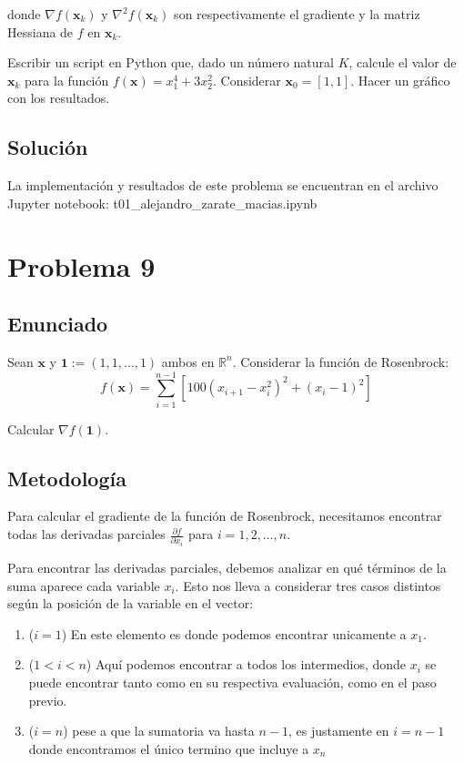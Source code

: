 \documentclass{article}
\begin{document}
donde $\nabla f(\mathbf{x}_k)$ y $\nabla^2 f(\mathbf{x}_k)$ son respectivamente el gradiente y la matriz Hessiana de $f$ en $\mathbf{x}_k$.

Escribir un script en Python que, dado un número natural $K$, calcule el valor de $\mathbf{x}_k$ para la función $f(\mathbf{x}) = x_1^4 + 3x_2^2$. Considerar $\mathbf{x}_0 = [1, 1]$. Hacer un gráfico con los resultados.

\subsection{Solución}
La implementación y resultados de este problema se encuentran en el archivo Jupyter notebook: t01\_alejandro\_zarate\_macias.ipynb

\section{Problema 9}

\subsection{Enunciado}
Sean $\mathbf{x}$ y $\mathbf{1} := (1, 1, \ldots, 1)$ ambos en $\mathbb{R}^n$. Considerar la función de Rosenbrock:
$$f(\mathbf{x}) = \sum_{i=1}^{n-1} \left[100(x_{i+1} - x_i^2)^2 + (x_i - 1)^2\right]$$

Calcular $\nabla f(\mathbf{1})$.

\subsection{Metodología}

Para calcular el gradiente de la función de Rosenbrock, necesitamos encontrar todas las derivadas parciales $\frac{\partial f}{\partial x_i}$ para $i = 1, 2, \ldots, n$.

Para encontrar las derivadas parciales, debemos analizar en qué términos de la suma aparece cada variable $x_i$. Esto nos lleva a considerar tres casos distintos según la posición de la variable en el vector:

\begin{enumerate}
    \item ($i = 1$) En este elemento es donde podemos encontrar unicamente a $x_1$.
    \item ($1 < i < n$) Aquí podemos encontrar a todos los intermedios, donde $x_i$ se puede encontrar tanto como en su respectiva evaluación, como en el paso previo.
    \item ($i=n$) pese a que la sumatoria va hasta $n-1$, es justamente en $i=n-1$ donde encontramos el único termino que incluye a $x_n$
\end{enumerate}
\end{document}
